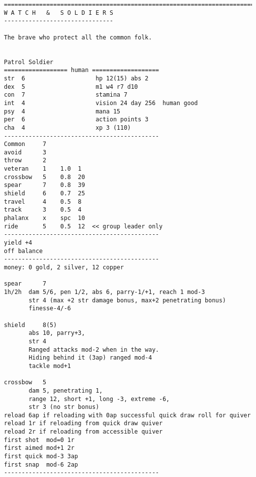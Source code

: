 \goodbreak \begin{samepage} \small \begin{verbatim}
================================================================================
W A T C H   &   S O L D I E R S
-------------------------------

The brave who protect all the common folk.


Patrol Soldier
================== human ===================
str  6                    hp 12(15) abs 2
dex  5                    m1 w4 r7 d10
con  7                    stamina 7
int  4                    vision 24 day 256  human good
psy  4                    mana 15
per  6                    action points 3
cha  4                    xp 3 (110)
--------------------------------------------
Common     7
avoid      3
throw      2
veteran    1    1.0  1
crossbow   5    0.8  20
spear      7    0.8  39
shield     6    0.7  25
travel     4    0.5  8
track      3    0.5  4
phalanx    x    spc  10
ride       5    0.5  12  << group leader only
--------------------------------------------
yield +4
off balance
--------------------------------------------
money: 0 gold, 2 silver, 12 copper

spear      7
1h/2h  dam 5/6, pen 1/2, abs 6, parry-1/+1, reach 1 mod-3
       str 4 (max +2 str damage bonus, max+2 penetrating bonus)
       finesse-4/-6

shield     8(5)
       abs 10, parry+3,
       str 4
       Ranged attacks mod-2 when in the way.
       Hiding behind it (3ap) ranged mod-4
       tackle mod+1

crossbow   5
       dam 5, penetrating 1,
       range 12, short +1, long -3, extreme -6,
       str 3 (no str bonus)
reload 6ap if reloading with 0ap successful quick draw roll for quiver
reload 1r if reloading from quick draw quiver
reload 2r if reloading from accessible quiver
first shot  mod=0 1r
first aimed mod+1 2r
first quick mod-3 3ap
first snap  mod-6 2ap
--------------------------------------------
\end{verbatim} \normalsize \end{samepage}

\

